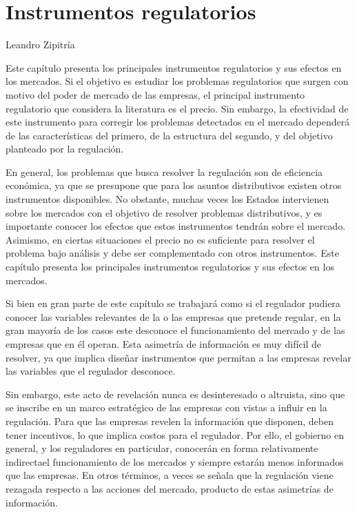 \documentclass[
  12pt,
  spanish,
]{book}
\begin{document}
\hypertarget{inst-reg}{%
\chapter{Instrumentos regulatorios}\label{inst-reg}}

Leandro Zipitría

Este capítulo presenta los principales instrumentos regulatorios y sus efectos en los mercados. Si el objetivo es estudiar los problemas regulatorios que surgen con motivo del poder de mercado de las empresas, el principal instrumento regulatorio que considera la literatura es el precio. Sin embargo, la efectividad de este instrumento para corregir los problemas detectados en el mercado dependerá de las características del primero, de la estructura del segundo, y del objetivo planteado por la regulación.

En general, los problemas que busca resolver la regulación son de eficiencia económica, ya que se presupone que para los asuntos distributivos existen otros instrumentos disponibles. No obstante, muchas veces los Estados intervienen sobre los mercados con el objetivo de resolver problemas distributivos, y es importante conocer los efectos que estos instrumentos tendrán sobre el mercado. Asimismo, en ciertas situaciones el precio no es suficiente para resolver el problema bajo análisis y debe ser complementado con otros instrumentos. Este capítulo presenta los principales instrumentos regulatorios y sus efectos en los mercados.

Si bien en gran parte de este capítulo se trabajará como si el regulador pudiera conocer las variables relevantes de la o las empresas que pretende regular, en la gran mayoría de los casos este desconoce el funcionamiento del mercado y de las empresas que en él operan. Esta asimetría de información es muy difícil de resolver, ya que implica diseñar instrumentos que permitan a las empresas revelar las variables que el regulador desconoce.

Sin embargo, este acto de revelación nunca es desinteresado o altruista, sino que se inscribe en un marco estratégico de las empresas con vistas a influir en la regulación. Para que las empresas revelen la información que disponen, deben tener incentivos, lo que implica costos para el regulador. Por ello, el gobierno en general, y los reguladores en particular, conocerán en forma relativamente indirectael funcionamiento de los mercados y siempre estarán menos informados que las empresas. En otros términos, a veces se señala que la regulación viene rezagada respecto a las acciones del mercado, producto de estas asimetrías de información.
\end{document}
